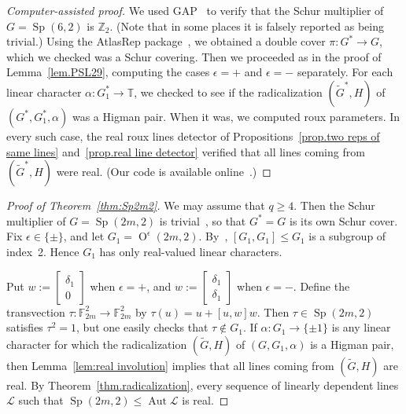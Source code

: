 \begin{proof}[Computer-assisted proof]
We used GAP~\cite{GAP} to verify that the Schur multiplier of $G=\operatorname{Sp}(6,2)$ is $\mathbb{Z}_2$.
(Note that in some places it is falsely reported as being trivial.)
Using the AtlasRep package~\cite{AtlasRep}, we obtained a double cover $\pi \colon G^* \to G$, which we checked was a Schur covering.
Then we proceeded as in the proof of Lemma~\ref{lem.PSL29}, computing the cases $\epsilon = +$ and $\epsilon = -$ separately.
For each linear character $\alpha \colon G_1^* \to \mathbb{T}$, we checked to see if the radicalization $(\widetilde{G}^*,H)$ of $(G^*,G_1^*,\alpha)$ was a Higman pair.
When it was, we computed roux parameters.
In every such case, the real roux lines detector of Propositions~\ref{prop.two reps of same lines} and~\ref{prop.real line detector} verified that all lines coming from $(\widetilde{G}^*,H)$ were real.
(Our code is available online~\cite{github}.)
\end{proof}

\begin{proof}[Proof of Theorem~\ref{thm:Sp2m2}]
We may assume that $q \geq 4$.
Then the Schur multiplier of $G = \operatorname{Sp}(2m,2)$ is trivial~\cite{Steinberg:62}, so that $G^*=G$ is its own Schur cover.
Fix $\epsilon \in \{ \pm \}$, and let $G_1 = \operatorname{O}^\epsilon(2m,2)$.
By~\cite[Proposition~14.23]{Grove:02}, $[G_1,G_1] \leq G_1$ is a subgroup of index~2.
Hence $G_1$ has only real-valued linear characters.

Put $w := \left[ \begin{array}{c} \delta_1 \\ 0 \end{array} \right]$ when $\epsilon = +$, and $w := \left[ \begin{array}{c} \delta_1 \\ \delta_1 \end{array} \right]$ when $\epsilon = -$.
Define the transvection $\tau \colon \mathbb{F}_{2m}^2 \to \mathbb{F}_{2m}^2$ by $\tau(u) = u + [u,w] w$.
Then $\tau \in \operatorname{Sp}(2m,2)$ satisfies $\tau^2 = 1$, but one easily checks that $\tau \notin G_1$.
If $\alpha \colon G_1 \to \{ \pm 1 \}$ is any linear character for which the radicalization $(\widetilde{G},H)$ of $(G,G_1,\alpha)$ is a Higman pair, then Lemma~\ref{lem:real involution} implies that all lines coming from $(\widetilde{G},H)$ are real.
By Theorem~\ref{thm.radicalization}, every sequence of linearly dependent lines $\mathscr{L}$ such that $\operatorname{Sp}(2m,2) \leq \operatorname{Aut} \mathscr{L}$ is real.
\end{proof}



